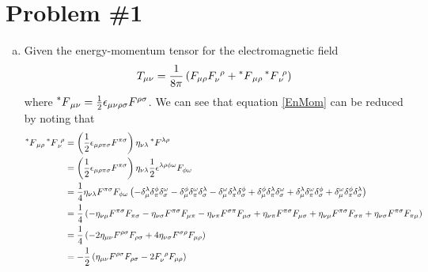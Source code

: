 \documentclass[11pt]{article}
\numberwithin{equation}{section}
\begin{document}


\section{Problem \#1}
\begin{enumerate}[(a)]
\item
    Given the energy-momentum tensor for the electromagnetic field
    \begin{equation}
        T_{\mu\nu} = \frac{1}{8\pi}\left(F_{\mu\rho}F^{\ \rho}_{\nu} + \prescript{*}{}{F}_{\mu\rho}\prescript{*}{}{F}^{\ \rho}_{\nu}\right)
    \label{EnMom}
    \end{equation}
    where $\prescript{*}{}{F}_{\mu\nu}=\frac{1}{2}\epsilon_{\mu\nu\rho\sigma}F^{\rho\sigma}$. We can see that 
    equation \ref{EnMom} can be reduced by noting that
    \begin{align*}
        \prescript{*}{}{F}_{\mu\rho}\prescript{*}{}{F}^{\ \rho}_{\nu} &= \left(\frac{1}{2}\epsilon_{\mu\rho\pi\sigma}F^{\pi\sigma}\right)\eta_{\nu\lambda}\prescript{*}{}{F}^{\lambda\rho}\\
            &= \left(\frac{1}{2}\epsilon_{\mu\rho\pi\sigma}F^{\pi\sigma}\right)\eta_{\nu\lambda}\frac{1}{2}\epsilon^{\lambda\rho\phi\omega}F_{\phi\omega}\\
            &= \frac{1}{4}\eta_{\nu\lambda}F^{\pi\sigma}F_{\phi\omega}\left(-\delta^{\lambda}_{\mu}\delta^{\phi}_{\pi}\delta^{\omega}_{\sigma}  - \delta^{\phi}_{\mu}\delta^{\omega}_{\pi}\delta^{\lambda}_{\sigma} - \delta^{\omega}_{\mu}\delta^{\lambda}_{\pi}\delta^{\phi}_{\sigma} + \delta^{\phi}_{\mu}\delta^{\lambda}_{\pi}\delta^{\omega}_{\sigma} + \delta^{\lambda}_{\mu}\delta^{\omega}_{\pi}\delta^{\phi}_{\sigma} + \delta^{\omega}_{\mu}\delta^{\phi}_{\pi}\delta^{\lambda}_{\sigma}\right)\\
            &= \frac{1}{4}\left(-\eta_{\nu\mu}F^{\pi\sigma}F_{\pi\sigma}
                - \eta_{\nu\sigma}F^{\pi\sigma}F_{\mu\pi}
                - \eta_{\nu\pi}F^{\sigma\pi}F_{\mu\sigma}
                + \eta_{\nu\pi}F^{\pi\sigma}F_{\mu\sigma}
                + \eta_{\nu\mu}F^{\pi\sigma}F_{\sigma\pi}
                + \eta_{\nu\sigma}F^{\pi\sigma}F_{\pi\mu} \right)\\
                &= \frac{1}{4}\left(-2\eta_{\mu\nu}F^{\rho\sigma}F_{\rho\sigma} + 4\eta_{\nu\sigma}F^{\sigma\rho}F_{\mu\rho}\right)\\
                &= -\frac{1}{2}\left(\eta_{\mu\nu}F^{\rho\sigma}F_{\rho\sigma} - 2F^{\ \rho}_{\nu}F_{\mu\rho}\right)\\

\end{align*}
\end{enumerate}
\end{document}
